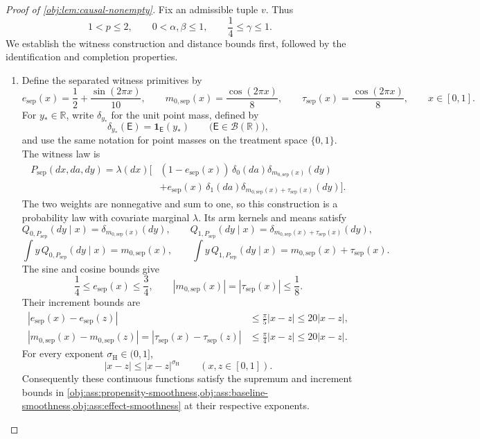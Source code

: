 \documentclass[11pt]{article}
\begin{document}
\begin{proof}[Proof of \cref{obj:lem:causal-nonempty}]
Fix an admissible tuple \(v\). Thus
\[
1<p\le2,\qquad
0<\alpha,\beta\le1,\qquad
\frac14\le\gamma\le1.
\]
We establish the witness construction and distance bounds first, followed by the identification and completion properties.

\begin{enumerate}
\item Define the separated witness primitives by
\[
e_{\mathrm{sep}}(x)=\frac12+\frac{\sin(2\pi x)}{10},
\qquad
m_{0,\mathrm{sep}}(x)=\frac{\cos(2\pi x)}8,
\qquad
\tau_{\mathrm{sep}}(x)=\frac{\cos(2\pi x)}8,
\qquad x\in[0,1].
\]
For \(y_\ast\in\mathbb R\), write \(\delta_{y_\ast}\) for the unit point mass, defined by
\[
\delta_{y_\ast}(\mathsf E)=\mathbf 1_{\mathsf E}(y_\ast)
\qquad
\bigl(\mathsf E\in\mathcal B(\mathbb R)\bigr),
\]
and use the same notation for point masses on the treatment space \(\{0,1\}\).
The witness law is
\[
\begin{aligned}
P_{\mathrm{sep}}(dx,da,dy)
=\lambda(dx)\bigl[
 &(1-e_{\mathrm{sep}}(x))\,
 \delta_0(da)\delta_{m_{0,\mathrm{sep}}(x)}(dy)\\
 &+e_{\mathrm{sep}}(x)\,
 \delta_1(da)\delta_{m_{0,\mathrm{sep}}(x)+\tau_{\mathrm{sep}}(x)}(dy)
\bigr].
\end{aligned}
\]
The two weights are nonnegative and sum to one, so this construction is a probability law with covariate marginal \(\lambda\). Its arm kernels and means satisfy
\[
Q_{0,P_{\mathrm{sep}}}(dy\mid x)
=\delta_{m_{0,\mathrm{sep}}(x)}(dy),
\qquad
Q_{1,P_{\mathrm{sep}}}(dy\mid x)
=\delta_{m_{0,\mathrm{sep}}(x)+\tau_{\mathrm{sep}}(x)}(dy),
\]
\[
\int y\,Q_{0,P_{\mathrm{sep}}}(dy\mid x)=m_{0,\mathrm{sep}}(x),
\qquad
\int y\,Q_{1,P_{\mathrm{sep}}}(dy\mid x)
=m_{0,\mathrm{sep}}(x)+\tau_{\mathrm{sep}}(x).
\]
The sine and cosine bounds give
\[
\frac14\le e_{\mathrm{sep}}(x)\le\frac34,
\qquad
|m_{0,\mathrm{sep}}(x)|=|\tau_{\mathrm{sep}}(x)|\le\frac18.
\]
Their increment bounds are
\[
\begin{aligned}
|e_{\mathrm{sep}}(x)-e_{\mathrm{sep}}(z)|
&\le\frac{\pi}{5}|x-z|
\le20|x-z|,\\
|m_{0,\mathrm{sep}}(x)-m_{0,\mathrm{sep}}(z)|
=|\tau_{\mathrm{sep}}(x)-\tau_{\mathrm{sep}}(z)|
&\le\frac{\pi}{4}|x-z|
\le20|x-z|.
\end{aligned}
\]
For every exponent \(\sigma_{\mathrm H}\in(0,1]\),
\[
|x-z|\le |x-z|^{\sigma_{\mathrm H}}
\qquad(x,z\in[0,1]).
\]
Consequently these continuous functions satisfy the supremum and increment bounds in
\cref{obj:ass:propensity-smoothness,obj:ass:baseline-smoothness,obj:ass:effect-smoothness}
at their respective exponents.


\end{enumerate}
\end{proof}
\end{document}
